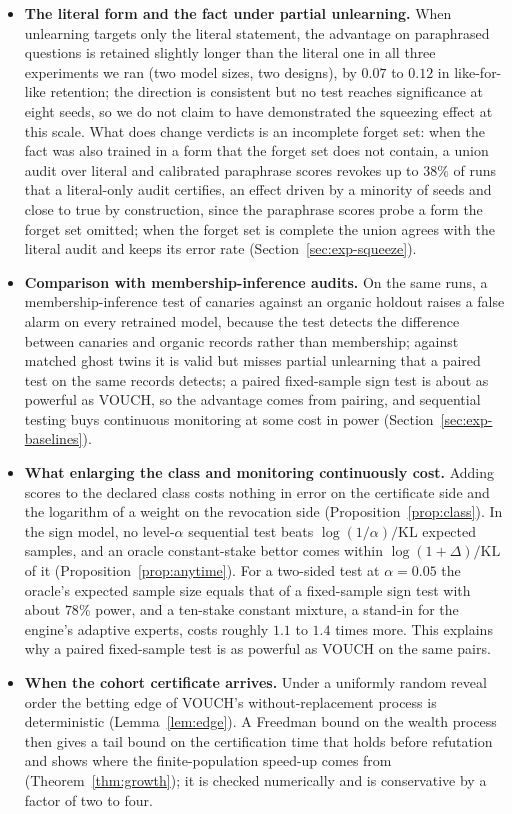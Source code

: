 \begin{itemize}
\item \textbf{The literal form and the fact under partial unlearning.} When unlearning
targets only the literal statement, the advantage on paraphrased questions is retained
slightly longer than the literal one in all three experiments we ran (two model sizes, two
designs), by $0.07$ to $0.12$ in like-for-like retention; the direction is consistent but
no test reaches significance at eight seeds, so we do not claim to have demonstrated the
squeezing effect at this scale. What does change verdicts is an incomplete forget set:
when the fact was also trained in a form that the forget set does not contain, a union
audit over literal and calibrated paraphrase scores revokes up to $38\%$ of runs that a
literal-only audit certifies, an effect driven by a minority of seeds and close to true by
construction, since the paraphrase scores probe a form the forget set omitted; when the
forget set is complete the union agrees with the literal audit and keeps its error rate
(Section~\ref{sec:exp-squeeze}).

\item \textbf{Comparison with membership-inference audits.} On the same runs, a
membership-inference test of canaries against an organic holdout raises a false alarm on
every retrained model, because the test detects the difference between canaries and
organic records rather than membership; against matched ghost twins it is valid but
misses partial unlearning that a paired test on the same records detects; a paired
fixed-sample sign test is about as powerful as VOUCH, so the advantage comes from pairing, and
sequential testing buys continuous monitoring at some cost in power
(Section~\ref{sec:exp-baselines}).

\item \textbf{What enlarging the class and monitoring continuously cost.} Adding scores to
the declared class costs nothing in error on the certificate side and the logarithm of a
weight on the revocation side (Proposition~\ref{prop:class}). In the sign model, no
level-$\alpha$ sequential test beats $\log(1/\alpha)/\mathrm{KL}$ expected samples, and an
oracle constant-stake bettor comes within $\log(1+\Delta)/\mathrm{KL}$ of it
(Proposition~\ref{prop:anytime}). For a two-sided test at $\alpha=0.05$ the oracle's
expected sample size equals that of a fixed-sample sign test with about $78\%$ power, and a
ten-stake constant mixture, a stand-in for the engine's adaptive experts, costs roughly
$1.1$ to $1.4$ times more. This explains why a paired fixed-sample test is as powerful as VOUCH on the
same pairs.

\item \textbf{When the cohort certificate arrives.} Under a uniformly random reveal order
the betting edge of VOUCH's without-replacement process is deterministic
(Lemma~\ref{lem:edge}). A Freedman bound on the wealth process then gives a tail bound on
the certification time that holds before refutation and shows where the
finite-population speed-up comes from (Theorem~\ref{thm:growth}); it is checked
numerically and is conservative by a factor of two to four.
\end{itemize}

